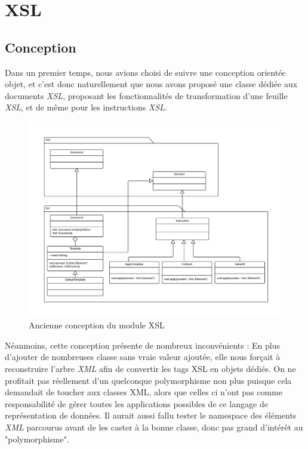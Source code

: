\chapter{XSL}

\section{Conception}

Dans un premier temps, nous avions choisi de suivre une conception orientée objet, et c'est donc
naturellement que nous avons proposé une classe dédiée aux documents \textit{XSL}, proposant les
fonctionnalités de transformation d'une feuille \textit{XSL}, et de même pour les instructions \textit{XSL}.

\begin{figure}[h!]
    \centering
    \includegraphics[width=\linewidth]{images/xsl-uml-old.pdf}
    \caption{Ancienne conception du module XSL}
    \label{oldXslClassDiagram}
\end{figure}

Néanmoins, cette conception présente de nombreux inconvénients : En plus d'ajouter de nombreuses classe sans vraie valeur ajoutée, elle
nous forçait à reconstruire l'arbre \textit{XML} afin de convertir les tags XSL en objets dédiés. On ne profitait pas réellement d'un quelconque
polymorphisme non plus puisque cela demandait de toucher aux classes XML, alors que celles ci n'ont pas comme responsabilité de gérer toutes
les applications possibles de ce langage de représentation de données. Il aurait aussi fallu tester le namespace des éléments \textit{XML} parcourus
avant de les caster à la bonne classe, donc pas grand d’intérêt au "polymorphisme".

